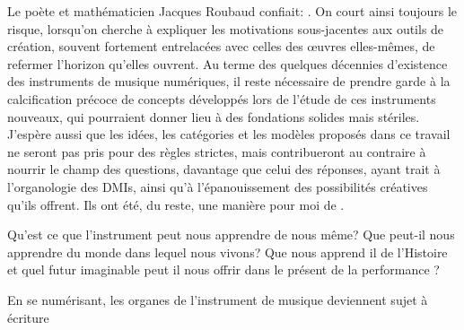 \noindent Le poète et mathématicien Jacques Roubaud confiait: . On court ainsi toujours le risque, lorsqu'on cherche à expliquer les motivations sous-jacentes aux outils de création, souvent fortement entrelacées avec celles des œuvres elles-mêmes, de refermer l'horizon qu'elles ouvrent. 
Au terme des quelques décennies d'existence des instruments de musique numériques, il reste nécessaire de prendre garde à la calcification précoce de concepts développés lors de l'étude de ces instruments nouveaux, qui pourraient donner lieu à des fondations solides mais stériles. J'espère aussi que les idées, les catégories et les modèles proposés dans ce travail ne seront pas pris pour des règles strictes, mais contribueront au contraire à nourrir le champ des questions, davantage que celui des réponses, ayant trait à l'organologie des \glspl{DMI}, ainsi qu'à l'épanouissement des possibilités créatives qu'ils offrent. Ils ont été, du reste, une manière pour moi de .


Qu'est ce que l'instrument peut nous apprendre de nous même? Que peut-il nous apprendre du monde dans lequel nous vivons? Que nous apprend il de l'Histoire et quel futur imaginable peut il nous offrir dans le présent de la performance ?


En se numérisant, les organes de l'instrument de musique deviennent sujet à écriture

